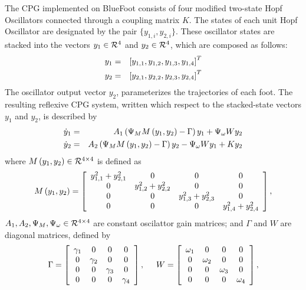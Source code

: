 		The CPG implemented on BlueFoot consists of four modified two-state Hopf Oscillators connected through a coupling matrix $K$. The states of each \Ith unit Hopf Oscillator are designated by the pair $\{y_{1,i},y_{2,i}\}$. These oscillator states are stacked into the vectors $y_{1}\in {\cal R}^{4}$ and $y_{2}\in {\cal R}^{4}$, which are composed as follows:
			\begin{eqnarray*}
				y_{1} &=& \left[y_{1,1},y_{1,2},y_{1,3},y_{1,4}\right]^{T}\nonumber\\
				y_{2} &=& \left[y_{2,1},y_{2,2},y_{2,3},y_{2,4}\right]^{T}
			\end{eqnarray*}
		The oscillator output vector $y_{2}$, parameterizes the trajectories of each \Ith foot. The resulting reflexive CPG system, written which respect to the stacked-state vectors $y_{1}$ and $y_{2}$, is described by
			\begin{eqnarray}
				\dot{y}_{1} &=& A_{1}\wrap{ \Psi_{M} M\wrap{y_{1},y_{2}} - \Gamma}{y}_{1} + \Psi_{\omega} W {y}_{2} 			\nonumber\\
				\dot{y}_{2} &=& A_{2}\wrap{ \Psi_{M} M\wrap{y_{1},y_{2}} - \Gamma}{y}_{2} - \Psi_{\omega} W {y}_{1} + K {y}_{2}	%
				\label{eq::cpg_ss_def}
			\end{eqnarray}
		where $M\left(y_{1},y_{2}\right) \in {\cal R}^{4\times4}$ is defined as
			\newcommand{\yy}[1]{y_{1,#1}^{2} + y_{2,#1}^{2}}
			\begin{equation*}
				M\wrap{y_{1},y_{2}} = \left[
				\begin{array}{cccc}
				\yy{1} 	& 	0 		& 	0 		& 	0 		\\ 
				0		& 	\yy{2}  & 	0 		& 	0 		\\ 
				0 		& 	0 		& 	\yy{3}  & 	0 		\\ 
				0 		& 	0 		& 	0 		& 	\yy{4}  \\ 
				\end{array}
				\right],
			\end{equation*}
		${A_{1},A_{2}, \Psi_{M}, \Psi_{\omega}} \in{\cal R}^{4\times4}$ are constant oscilattor gain matrices; and $\Gamma$ and $W$ are diagonal matrices, defined by
			\begin{equation*}
				\Gamma = \left[
				\begin{array}{cccc}
				\gamma_{1} 	& 	0 				& 	0 				& 	0 		\\ 
				0				& 	\gamma_{2} 	& 	0 				& 	0 		\\ 
				0 				& 	0 				& 	\gamma_{3} 	& 	0 		\\ 
				0 				& 	0 				& 	0 				& 	\gamma_{4}  \\ 
				\end{array}
				\right],
				\hspace{5mm}
				W = \left[
				\begin{array}{cccc}
				\omega_{1} 	& 	0 				& 	0 				& 	0 		\\ 
				0				& 	\omega_{2} 	& 	0 				& 	0 		\\ 
				0 				& 	0 				& 	\omega_{3} 	& 	0 		\\ 
				0 				& 	0 				& 	0 				& 	\omega_{4}  \\ 
				\end{array}
				\right],
			\end{equation*}

